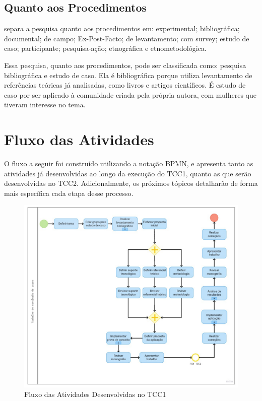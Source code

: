 \subsection{Quanto aos Procedimentos}

 separa a pesquisa quanto aos 
procedimentos em: experimental; bibliográfica; 
documental; de campo; Ex-Post-Facto; 
de levantamento; com survey; estudo de caso; 
participante; pesquisa-ação; etnográfica e etnometodológica.

Essa pesquisa, quanto aos procedimentos, pode ser classificada como: pesquisa bibliográfica e 
estudo de caso.
Ela é bibliográfica porque utiliza levantamento de referências teóricas já analisadas, 
como livros e artigos científicos. É estudo de caso por 
ser aplicado à comunidade criada pela própria autora, com 
mulheres que tiveram interesse no tema.


\section{Fluxo das Atividades}

O fluxo a seguir foi construído utilizando a notação BPMN, e apresenta 
tanto as atividades já desenvolvidas ao longo da execução do 
TCC1, quanto as que serão desenvolvidas no TCC2. 
Adicionalmente, os próximos tópicos detalharão de 
forma mais específica cada etapa desse processo.

\begin{figure}[h]
	\centering
	\includegraphics[keepaspectratio=true,scale=0.6]{figuras/fluxodeatividade.pdf}
	\caption{Fluxo das Atividades Desenvolvidas no TCC1 }
        \label{fig03}
\end{figure}

